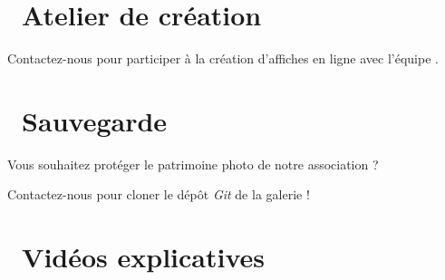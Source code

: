 \documentclass[12pt,nofoldmark,notumble]{leaflet}
\begin{document}
\section{\faUniversity  Atelier de création}

Contactez-nous pour participer à la création d'affiches en ligne
avec l'équipe .

\begin{center}
  \setlength{\fboxsep}{0pt}%
  \setlength{\fboxrule}{0pt}%
\end{center}
\vspace*{\fill}
\section{\faSave  Sauvegarde}

Vous souhaitez protéger le patrimoine photo de notre association ?

Contactez-nous pour cloner le dépôt \emph{Git} de la galerie !
\vspace*{\fill}
\section{\faYoutube  Vidéos explicatives}


\begin{center}
  \setlength{\fboxsep}{0pt}%
  \setlength{\fboxrule}{0pt}%
 \end{center} 
\end{document}
